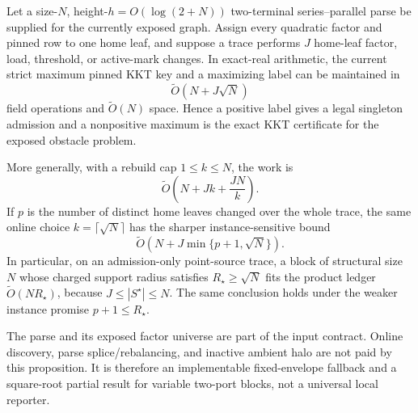 \begin{proposition}
\label{prop:aesp-cd-sp-static-epoch-reporter}
Let a size-\(N\), height-\(h=O(\log(2+N))\) two-terminal
series--parallel parse be supplied for the currently exposed graph.  Assign
every quadratic factor and pinned row to one home leaf, and suppose a trace
performs \(J\) home-leaf factor, load, threshold, or active-mark changes.  In
exact-real arithmetic, the current strict maximum pinned KKT key and a
maximizing label can be maintained in
\begin{equation}
 \widetilde O\!\left(N+J\sqrt N\right)
 \label{eq:aesp-cd-sp-static-epoch-work}
\end{equation}
field operations and \(\widetilde O(N)\) space.  Hence a positive label gives
a legal singleton admission and a nonpositive maximum is the exact KKT
certificate for the exposed obstacle problem.

More generally, with a rebuild cap \(1\leq k\leq N\), the work is
\begin{equation}
 \widetilde O\!\left(N+Jk+\frac{JN}{k}\right).
 \label{eq:aesp-cd-sp-static-epoch-tradeoff}
\end{equation}
If \(p\) is the number of distinct home leaves changed over the whole trace,
the same online choice \(k=\lceil\sqrt N\rceil\) has the sharper
instance-sensitive bound
\begin{equation}
 \widetilde O\!\left(
   N+J\min\{p+1,\sqrt N\}
 \right).
 \label{eq:aesp-cd-sp-static-epoch-productive}
\end{equation}
In particular, on an admission-only point-source trace, a block of structural
size \(N\) whose charged support radius satisfies
\(R_\star\geq\sqrt N\) fits the product ledger
\(\widetilde O(NR_\star)\), because \(J\leq |S^\star|\leq N\).
The same conclusion holds under the weaker instance promise
\(p+1\leq R_\star\).

The parse and its exposed factor universe are part of the input contract.
Online discovery, parse splice/rebalancing, and inactive ambient halo are not
paid by this proposition.  It is therefore an implementable fixed-envelope
fallback and a square-root partial result for variable two-port blocks, not a
universal local reporter.
\end{proposition}

